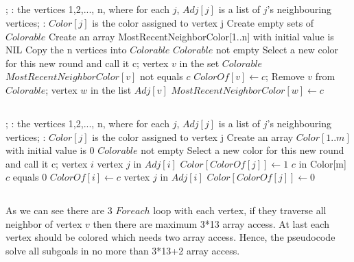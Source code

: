 \subsection{}
\Prog\qq     %
; \qq 
\INPUT: the vertices 1,2,..., n, where for each $j$, $Adj[j]$ is a list of $j$'s neighbouring vertices;\qq
\OUTPUT: $Color[j]$ is the color assigned to vertex j\p
Create empty sets of $Colorable$\p
Create an array MostRecentNeighborColor[1..n] with initial value is NIL
Copy the n vertices into $Colorable$\p
\While $Colorable$ not empty \Do\p
Select a new color for this new round and call it c;\p
\Foreach vertex $v$ in the set $Colorable$ \Do\p
\If $MostRecentNeighborColor[v]$ not equals $c$ \Then\p
$ColorOf[v] \leftarrow c$;\p
Remove $v$ from $Colorable$;\p
\Foreach vertex $w$ in the list $Adj[v]$ \Do\p
$MostRecentNeighborColor[w] \leftarrow c$\p
\Endfor\p
\Endif\p
\Endfor\p
\Endwhile\qq
\Fini

\subsection{}

\Prog\qq     %
; \qq 
\INPUT: the vertices 1,2,..., n, where for each $j$, $Adj[j]$ is a list of $j$'s neighbouring vertices;\qq
\OUTPUT: $Color[j]$ is the color assigned to vertex j\p
Create an array $Color[1..m]$ with initial value is 0\p
\While $Colorable$ not empty \Do\p
Select a new color for this new round and call it c;\p
\Foreach vertex $i$  \Do\p
\Foreach vertex $j$ in $Adj[i]$ \Do\p
$Color[ColorOf[j]] \leftarrow 1$\p
\Endfor\p
\Foreach $c$ in Color[m] \Do\p
\If $c$ equals 0 \Then\p
$ColorOf[i] \leftarrow c$\p
\Endif\p
\Foreach vertex $j$ in $Adj[i]$ \Do\p
$Color[ColorOf[j]] \leftarrow 0$\p
\Endfor\p

\Endfor\p
\Endwhile\qq
\Fini

\subsection{}
As we can see there are 3 $Foreach$ loop with each vertex, if they traverse all neighbor of vertex $v$ then there are maximum  3*13 array access.
At  last each vertex should be colored which needs two array access.
Hence, the pseudocode solve all subgoals in no more than 3*13+2 array access.

